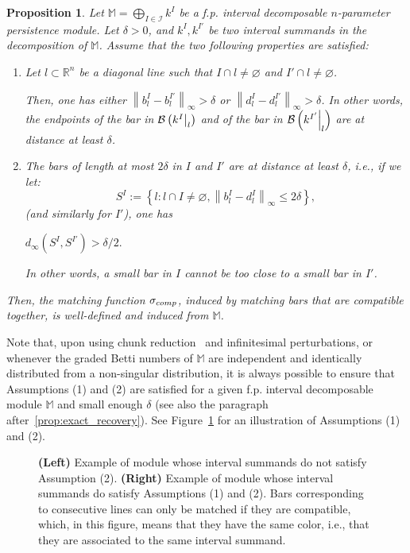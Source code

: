 \documentclass{article}
\newcommand{\field}{k}
\newcommand{\norm}[1]{\left\lVert #1 \right\rVert}
\newcommand{\barcode}[1]{ {\mathcal B}\left(#1\right) }
\newcommand{\induced}[1]{\field^{#1}}
\newcommand{\matching}{\sigma}
\newcommand{\R}{\mathbb{R}}
\newcommand{\Mbb}{\mathbb{M}}
\newcommand{\M}{{\mathbb M}}
\newcommand\restr[2]{{  \left.\kern-\nulldelimiterspace #1 \vphantom{\big|} \right|_{#2}  }}
\newtheorem{proposition}[theorem]{Proposition}%
\newcommand{\rebuttal}[1]{{ #1}}
\begin{document}
\begin{proposition}\label{prop:general_exact_matching}
	Let $\M= \bigoplus_{I \in \mathcal I}\rebuttal{k^{I}}$ be a \rebuttal{f.p.} interval decomposable $n$-parameter persistence module.
	Let $\delta > 0$, and $\rebuttal{k^{I}},\rebuttal{k^{I'}}$ be two interval summands in the decomposition of $\M$. %
	Assume that the two following properties are satisfied:
	\begin{enumerate}
		\item Let $l \subset \R^n$  be a diagonal line such that ${I}\cap l\neq \varnothing$ and ${I'}\cap l\neq \varnothing$.

		      Then, one has either $\norm{ b_l^I - b_l^{I'}}_\infty > \delta$ or $ \norm{d_l^I - d_l^{I'}}_\infty > \delta$.
		      In other words, the endpoints of the bar in $\barcode{\rebuttal{ \restr{\induced{I}}{l} }}$ and of the bar in $\barcode{\rebuttal{\restr{\induced{I'}}{l}}}$
		      are at distance at least $\delta$.

		\item %
		      The bars of length at most $2\delta$ in $I$ and $I'$ are at distance at least $\delta$, i.e.,
		      if we let:
		      $$S^I:=\left\{ l:  l\cap {I} \neq \varnothing,\norm{ b_l^{I} - d_l^{I}}_{\infty} \le 2 \delta\right\},$$
		      (and similarly for $I'$),
		      one has

		      $d_{\infty}
			      \left(
			      S^I,
			      S^{I'}
			      \right)
			      > \delta/2.$

		      In other words, a small bar in $I$ cannot be too close to a small bar in $I'$.
	\end{enumerate}
	Then, the matching function $\matching_{\rm comp}$,
	induced by matching bars that are compatible together, is well-defined and \rebuttal{induced from $\Mbb$}. \\
\end{proposition}

\rebuttal{Note that, upon using chunk reduction~\cite{fugacciChunkReductionMultiParameter2019} and infinitesimal perturbations, or whenever the graded Betti numbers of $\Mbb$ are independent and identically distributed from a non-singular distribution, it is always possible to ensure that Assumptions (1) and (2) are satisfied for a given f.p. interval decomposable module $\Mbb$ and small enough $\delta$ (see also the paragraph after~\cref{prop:exact_recovery}).}
See Figure~\ref{fig:compatibility} for an illustration of Assumptions (1) and (2).

\begin{figure}
	\centering
	
	\caption{
		\textbf{(Left)} Example of module whose interval summands do not satisfy Assumption (2).
		\textbf{(Right)} Example of module whose interval summands do satisfy Assumptions (1) and (2).
		Bars corresponding to consecutive lines can only be matched if they are compatible, which, in this figure, means that they have the same color, i.e., that they
		are associated to the same interval summand.
	}\label{fig:compatibility}
\end{figure}
\end{document}
